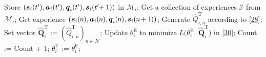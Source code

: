 \documentclass[10pt, journal,letterpaper]{IEEEtran}
\begin{document}
\begin{algorithm}[tbp]
\begin{algorithmic}[1]
		\State Store $(\boldsymbol{s}_i(t'), \boldsymbol{a}_i(t'), \boldsymbol{q}_i(t'), \boldsymbol{s}_i(t'\hspace{-1mm}+1))$ in $\mathcal{M}_i$;
		\State Get a collection of experiences  $\mathcal{I}$ from $\mathcal{M}_i$; 
		\State Get experience $(\boldsymbol{s}_i(\hspace{-0.2mm}n\hspace{-0.2mm}), \boldsymbol{a}_i(\hspace{-0.2mm}n\hspace{-0.2mm}), \boldsymbol{q}_i(\hspace{-0.2mm}n\hspace{-0.2mm}), \boldsymbol{s}_i(\hspace{-0.2mm}n\hspace{-0.5mm}+1\hspace{-0.2mm}))$; 
		\State Generate $\hat{Q}_{i,n}^{\text{T}}$ according to   \eqref{28};
		\EndFor
		\State Set vector  $\hat{\mathbf{Q}}_i^{\text{T}} := (\hat{Q}^{\text{T}}_{i,n})_{n \in \mathcal{N}}$;
		\State Update $\theta_i^{\text{E}}$ to minimize $L(\theta_i^{\text{E}}$, $\hat{\mathbf{Q}}_i^{\text{T}})$ in   \eqref{30};
		\State Count := Count + 1;
		\State $\theta_i^{\text{T}}$ := $\theta_i^{\text{E}}$;
		\EndIf
		\EndIf
		\EndWhile
		
	\end{algorithmic}
\end{algorithm}
\end{document}
